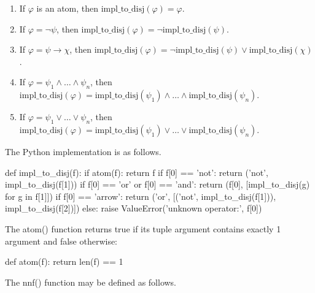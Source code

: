\documentclass[a4paper,notitlepage]{scrartcl}
\let\phi\varphi
\begin{document}
\begin{enumerate}

\item
If $\phi$ is an atom, then $\mathrm{impl\_to\_disj}(\phi) = \phi$.

\item
If $\phi = \lnot\psi$, then $\mathrm{impl\_to\_disj}(\phi) =
\lnot\mathrm{impl\_to\_disj}(\psi)$.

\item
If $\phi = \psi \to \chi$, then $\mathrm{impl\_to\_disj}(\phi) =
\lnot\mathrm{impl\_to\_disj}(\psi) \lor \mathrm{impl\_to\_disj}(\chi)$.

\item
If $\phi = \psi_1 \land \ldots \land \psi_n$, then
$\mathrm{impl\_to\_disj}(\phi) = \mathrm{impl\_to\_disj}(\psi_1) \land \ldots
\land \mathrm{impl\_to\_disj}(\psi_n)$.

\item
If $\phi = \psi_1 \lor \ldots \lor \psi_n$, then
$\mathrm{impl\_to\_disj}(\phi) = \mathrm{impl\_to\_disj}(\psi_1) \lor \ldots
\lor \mathrm{impl\_to\_disj}(\psi_n)$.

\end{enumerate}

\noindent
The Python implementation is as follows.

\begin{code}
def impl_to_disj(f):
    if atom(f):
        return f
    if f[0] == 'not':
        return ('not', impl_to_disj(f[1]))
    if f[0] == 'or' or f[0] == 'and':
        return (f[0], [impl_to_disj(g) for g in f[1]])
    if f[0] == 'arrow':
        return ('or', [('not', impl_to_disj(f[1])), impl_to_disj(f[2])])
    else:
        raise ValueError('unknown operator:', f[0])
\end{code}

\noindent
The atom() function returns true if its tuple argument contains exactly 1
argument and false otherwise:

\begin{code}
def atom(f):
    return len(f) == 1
\end{code}

The nnf() function may be defined as follows.
\end{document}
